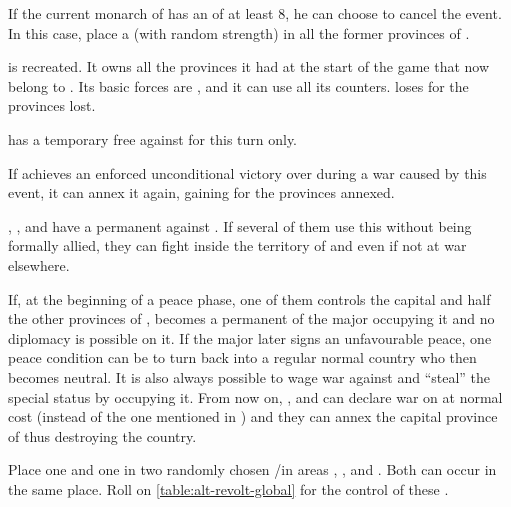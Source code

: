 

\condition{}
\aparag If the current monarch of \TUR has an \ADM of at least 8, he can
choose to cancel the event.
\bparag In this case, place a \REVOLT (with random strength) in all the former
provinces of \paysmamelouks.

\phevnt
\aparag \paysmamelouks is recreated. It owns all the provinces it had at the
start of the game that now belong to \TUR.
\bparag Its basic forces are \ARMY\facemoins, \LD and it can use all its
counters.
\bparag \TUR loses \VP for the provinces lost.

\phdipl
\aparag \TUR has a temporary free \CB against \paysmamelouks for this turn
only.

\phpaix
\aparag If \TUR achieves an enforced unconditional victory over \paysmamelouks
during a war caused by this event, it can annex it again, gaining \VP for the
provinces annexed.

\effetlong
\aparag \FRA, \ENG, \HOL and \HIS have a permanent \CB against \paysmamelouks.
\bparag If several of them use this \CB without being formally allied, they
can fight inside the territory of \paysmamelouks and 
even if not at war elsewhere.

\aparag If, at the beginning of a peace phase, one of them controls the
capital and half the other provinces of \paysmamelouks, \paysmamelouks becomes
a permanent \VASSAL of the major occupying it and no diplomacy is possible on
it.
\bparag If the major later signs an unfavourable peace, one peace condition
can be to turn back \paysmamelouks into a regular normal country who then
becomes neutral.
\bparag It is also always possible to wage war against \paysmamelouks and
``steal'' the special \VASSAL status by occupying it.
\aparag From now on, \FRA, \ENG and \HOL can declare war on \payschevaliers at
normal cost (instead of the one mentioned in ) and
they can annex the capital province of \payschevaliers thus destroying the
country.





\phevnt
\aparag Place one \REVOLT \facemoins and one \REVOLT \faceplus in two randomly
chosen \COL/\TP in areas \granderegionJava, \granderegionSumatra,
\granderegionBorneo and \granderegionCelebes. Both \REVOLT can occur in the
same place. Roll on \ref{table:alt-revolt-global} for the control of these
\REVOLT .



